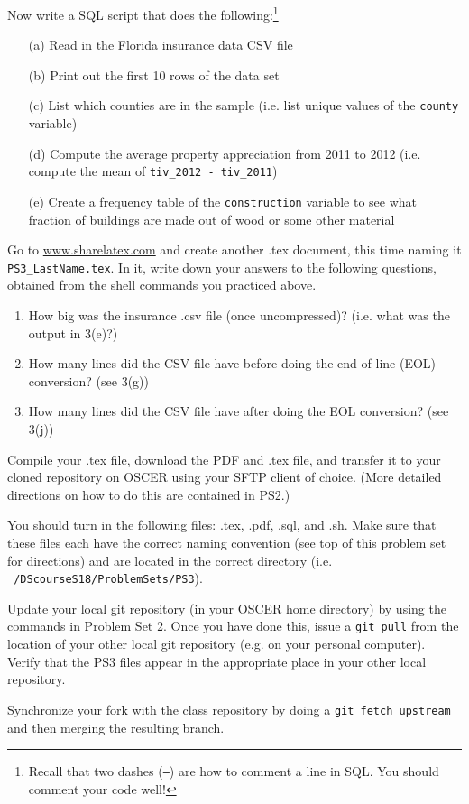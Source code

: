 \documentclass[12pt,english]{exam}
\begin{document}
\begin{questions}
\question Now write a SQL script that does the following:\footnote{Recall that two dashes (\texttt{--}) are how to comment a line in SQL. You should comment your code well!}
\begin{itemize}
	\item[(a)] Read in the Florida insurance data CSV file
	\item[(b)] Print out the first 10 rows of the data set
	\item[(c)] List which counties are in the sample (i.e. list unique values of the \texttt{county} variable)
	\item[(d)] Compute the average property appreciation from 2011 to 2012 (i.e. compute the mean of \texttt{tiv\_2012 - tiv\_2011})
	\item[(e)] Create a frequency table of the \texttt{construction} variable to see what fraction of buildings are made out of wood or some other material
\end{itemize}

\question Go to \url{www.sharelatex.com} and create another .tex document, this time naming it \texttt{PS3\_LastName.tex}. In it, write down your answers to the following questions, obtained from the shell commands you practiced above.
\begin{enumerate}
	\item How big was the insurance .csv file (once uncompressed)? (i.e. what was the output in 3(e)?)
	\item How many lines did the CSV file have before doing the end-of-line (EOL) conversion? (see 3(g))
	\item How many lines did the CSV file have after doing the EOL conversion? (see 3(j))
\end{enumerate}

\question Compile your .tex file, download the PDF and .tex file, and transfer it to your cloned repository on OSCER using your SFTP client of choice. (More detailed directions on how to do this are contained in PS2.)

\question You should turn in the following files: .tex, .pdf, .sql, and .sh. Make sure that these files each have the correct naming convention (see top of this problem set for directions) and are located in the correct directory (i.e. \texttt{~/DScourseS18/ProblemSets/PS3}).

\question Update your local git repository (in your OSCER home directory) by using the commands in Problem Set 2. Once you have done this, issue a \texttt{git pull} from the location of your other local git repository (e.g. on your personal computer). Verify that the PS3 files appear in the appropriate place in your other local repository.

\question Synchronize your fork with the class repository by doing a \texttt{git fetch upstream} and then merging the resulting branch. 

\end{questions}
\end{document}

